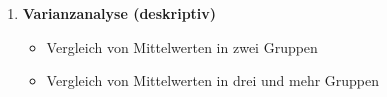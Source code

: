 \documentclass[a4paper,fontsize=12pt]{scrartcl}
\begin{document}
\begin{enumerate}
  \item{\textbf{Varianzanalyse (deskriptiv)}
    \begin{itemize}
      \item{Vergleich von Mittelwerten in zwei Gruppen}
      \item{Vergleich von Mittelwerten in drei und mehr Gruppen}
    \end{itemize}
  }
  
  
\end{enumerate}



\end{document}
